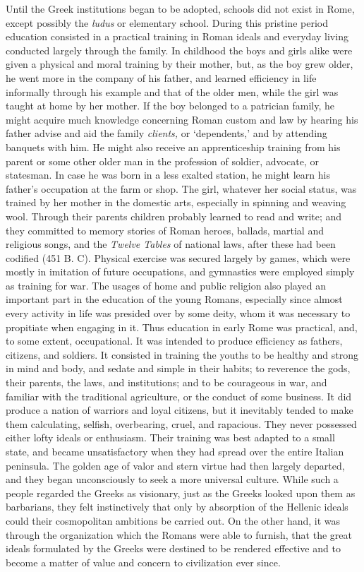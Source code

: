 \documentclass[]{book}
\begin{document}
Until the Greek institutions began to be adopted, schools did not exist in Rome, except possibly the \emph{ludus} or elementary school. During this pristine period education consisted in a practical training in Roman ideals and everyday living conducted largely through the family. In childhood the boys and girls alike were given a physical and moral training by their mother, but, as the boy grew older, he went more in the company of his father, and learned efficiency in life informally through his example and that of the older men, while the girl was taught at home by her mother. If the boy belonged to a patrician family, he might acquire much knowledge concerning Roman custom and law by hearing his father advise and aid the family \emph{clients,} or `dependents,' and by attending banquets with him. He might also receive an apprenticeship training from his parent or some other older man in the profession of soldier, advocate, or statesman. In case he was born in a less exalted station, he might learn his father's occupation at the farm or shop. The girl, whatever her social status, was trained by her mother in the domestic arts, especially in spinning and weaving wool. Through their parents children probably learned to read and write; and they committed to memory stories of Roman heroes, ballads, martial and religious songs, and the \emph{Twelve Tables} of national laws, after these had been codified (451 B. C). Physical exercise was secured largely by games, which were mostly in imitation of future occupations, and gymnastics were employed simply as training for war. The usages of home and public religion also played an important part in the education of the young Romans, especially since almost every activity in life was presided over by some deity, whom it was necessary to propitiate when engaging in it. Thus education in early Rome was practical, and, to some extent, occupational. It was intended to produce efficiency as fathers, citizens, and soldiers. It consisted in training the youths to be healthy and strong in mind and body, and sedate and simple in their habits; to reverence the gods, their parents, the laws, and institutions; and to be courageous in war, and familiar with the traditional agriculture, or the conduct of some business. It did produce a nation of warriors and loyal citizens, but it inevitably tended to make them calculating, selfish, overbearing, cruel, and rapacious. They never possessed either lofty ideals or enthusiasm. Their training was best adapted to a small state, and became unsatisfactory when they had spread over the entire Italian peninsula. The golden age of valor and stern virtue had then largely departed, and they began unconsciously to seek a more universal culture. While such a people regarded the Greeks as visionary, just as the Greeks looked upon them as barbarians, they felt instinctively that only by absorption of the Hellenic ideals could their cosmopolitan ambitions be carried out. On the other hand, it was through the organization which the Romans were able to furnish, that the great ideals formulated by the Greeks were destined to be rendered effective and to become a matter of value and concern to civilization ever since.
\end{document}
